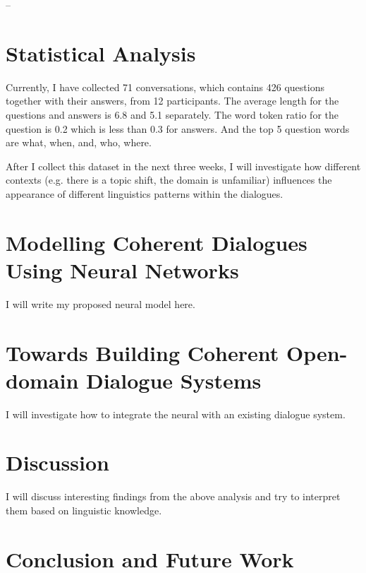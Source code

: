 \documentclass[bsc,frontabs,twoside,singlespacing,parskip,deptreport]{infthesis}     %
\begin{document}
-- 











\chapter{Statistical Analysis}

Currently, I have collected 71 conversations, which contains 426 questions together with their answers, from 12 participants. The average length for the questions and answers is 6.8 and 5.1 separately. The word token ratio for the question is 0.2 which is less than 0.3 for answers. And the top 5 question words are what, when, and, who, where.

After I collect this dataset in the next three weeks, I will investigate how different contexts (e.g. there is a topic shift, the domain is unfamiliar) influences the appearance of different linguistics patterns within the dialogues.

\chapter{Modelling Coherent Dialogues Using Neural Networks}
I will write my proposed neural model here.

\chapter{Towards Building Coherent Open-domain Dialogue Systems}
I will investigate how to integrate the neural with an existing dialogue system. 

\chapter{Discussion}
I will discuss interesting findings from the above analysis and try to interpret them based on linguistic knowledge. 

\chapter{Conclusion and Future Work}



\end{document}

